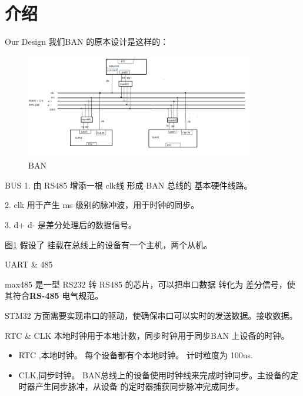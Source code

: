 \section{介绍}

\begin{frame}[fragile]{Our Design}
我们BAN 的原本设计是这样的：
\begin{figure}[htbp]
\begin{center}
\includegraphics[width=10cm]{img/overview}
\caption{BAN }
\label{Overview}
\end{center}
\vspace{-0.5em}
\end{figure}
\end{frame}


\begin{frame}[fragile]{BUS}
1. 由 RS485 增添一根 clk线 形成 BAN 总线的 基本硬件线路。

2. clk 用于产生 ms 级别的脉冲波，用于时钟的同步。

3.  d+ d- 是差分处理后的数据信号。

图\ref{Overview} 假设了 挂载在总线上的设备有一个主机，两个从机。

\end{frame}

\begin{frame}[fragile]{UART \& 485}

max485 是一型 RS232 转 RS485 的芯片，可以把串口数据 转化为 差分信号，使其符合\textbf{RS-485}
电气规范。

STM32 方面需要实现串口的驱动，使确保串口可以实时的发送数据。接收数据。

\end{frame}

\begin{frame}[fragile]{RTC \& CLK}
本地时钟用于本地计数，同步时钟用于同步BAN 上设备的时钟。
\begin{itemize}
\item  RTC ,本地时钟。 每个设备都有个本地时钟。 计时粒度为 100us.

\item  CLK,同步时钟。 BAN总线上的设备使用时钟线来完成时钟同步。主设备的定时器产生同步脉冲，从设备
的定时器捕获同步脉冲完成同步。
\end{itemize}


\end{frame}


